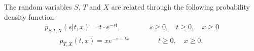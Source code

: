 \question[25] 

\ifspanish

\else

The random variables $S$, $T$ and $X$ are related through the following probability density function
\begin{align*}
p_{S| T, X}(s| t, x) = t \cdot e^{-st},  \qquad\qquad   s \ge 0, \quad t \ge 0, \quad x \ge 0  
\end{align*}
\begin{align*}
p_{T, X}(t,x) = x e^{-x-tx}       \qquad\qquad   t \ge 0, \quad x \ge 0, 
\end{align*}


